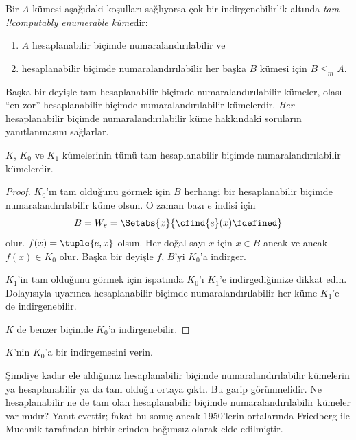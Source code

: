 


\begin{defn}
Bir $A$ kümesi aşağıdaki koşulları sağlıyorsa çok-bir indirgenebilirlik
altında \emph{tam !!{computably enumerable} küme}dir:
\begin{enumerate}
\item $A$ hesaplanabilir biçimde numaralandırılabilir ve
\item hesaplanabilir biçimde numaralandırılabilir her başka $B$ kümesi için
  $B\leq_m A$.
\end{enumerate}
\end{defn}

Başka bir deyişle tam hesaplanabilir biçimde numaralandırılabilir kümeler,
olası ``en zor'' hesaplanabilir biçimde numaralandırılabilir kümelerdir.
\emph{Her} hesaplanabilir biçimde numaralandırılabilir küme hakkındaki
soruların yanıtlanmasını sağlarlar.

\begin{thm}
$K$, $K_0$ ve $K_1$ kümelerinin tümü tam hesaplanabilir biçimde
numaralandırılabilir kümelerdir.
\end{thm}

\begin{proof}
$K_0$'ın tam olduğunu görmek için $B$ herhangi bir hesaplanabilir biçimde
numaralandırılabilir küme olsun. O zaman bazı $e$ indisi için
\[
  B=W_e=\Setabs{x}{\cfind{e}(x)\fdefined}
\]
olur. $f(x)=\tuple{e,x}$ olsun. Her doğal sayı $x$ için $x\in B$ ancak ve
ancak $f(x)\in K_0$ olur. Başka bir deyişle $f$, $B$'yi $K_0$'a indirger.

$K_1$'in tam olduğunu görmek için  ispatında $K_0$'ı
$K_1$'e indirgediğimize dikkat edin. Dolayısıyla
 uyarınca hesaplanabilir biçimde
numaralandırılabilir her küme $K_1$'e de indirgenebilir.

$K$ de benzer biçimde $K_0$'a indirgenebilir.
\end{proof}

\begin{prob}
$K$'nin $K_0$'a bir indirgemesini verin.
\end{prob}

\begin{digress}
Şimdiye kadar ele aldığımız hesaplanabilir biçimde numaralandırılabilir
kümelerin ya hesaplanabilir ya da tam olduğu ortaya çıktı. Bu garip
görünmelidir. Ne hesaplanabilir ne de tam olan hesaplanabilir biçimde
numaralandırılabilir kümeler var mıdır? Yanıt evettir; fakat bu sonuç ancak
1950'lerin ortalarında Friedberg ile Muchnik tarafından birbirlerinden
bağımsız olarak elde edilmiştir.
\end{digress}

